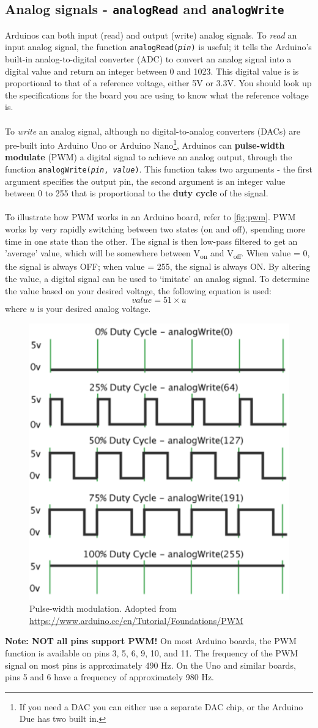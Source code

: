 \documentclass{article}
\begin{document}
\subsection{Analog signals - \texttt{analogRead} and \texttt{analogWrite}}
Arduinos can both input (read) and output (write) analog signals. To \textit{read} an input analog signal, the function \texttt{analogRead(\textit{pin})} is useful; it tells the Arduino's built-in analog-to-digital converter (ADC) to convert an analog signal into a digital value and return an integer between 0 and 1023. This digital value is is proportional to that of a reference voltage, either 5V or 3.3V. You should look up the specifications for the board you are using to know what the reference voltage is.\\\\
To \textit{write} an analog signal, although no digital-to-analog converters (DACs) are pre-built into Arduino Uno or Arduino Nano\footnote{If you need a DAC you can either use a separate DAC chip, or the Arduino Due has two built in.}, Arduinos can \textbf{pulse-width modulate} (PWM) a digital signal to achieve an analog output, through the function \texttt{analogWrite(\textit{pin}, \textit{value})}. This function takes two arguments - the first argument specifies the output pin, the second argument is an integer value between 0 to 255 that is proportional to the \textbf{duty cycle} of the signal. \\\\ 
To illustrate how PWM works in an Arduino board, refer to  \autoref{fig:pwm}. PWM works by very rapidly switching between two states (on and off), spending more time in one state than the other. The signal is then low-pass filtered to get an 'average' value, which will be somewhere between V\textsubscript{on} and V\textsubscript{off}. When value = 0, the signal is always OFF; when value = 255, the signal is always ON. By altering the value, a digital signal can be used to `imitate' an analog signal. To determine the value based on your desired voltage, the following equation is used:
\[value = 51 \times u\]
where $u$ is your desired analog voltage.
\begin{figure}[H]
    \centering
    \includegraphics[width=.4\textwidth]{pwm.png}
    \caption{Pulse-width modulation. Adopted from \href{https://www.arduino.cc/en/Tutorial/Foundations/PWM}{https://www.arduino.cc/en/Tutorial/Foundations/PWM}}
    \label{fig:pwm}
\end{figure}
\noindent \textbf{Note: NOT all pins support PWM!} On most Arduino boards, the PWM function is available on pins 3, 5, 6, 9, 10, and 11. The frequency of the PWM signal on most pins is approximately 490 Hz. On the Uno and similar boards, pins 5 and 6 have a frequency of approximately 980 Hz.
\end{document}

